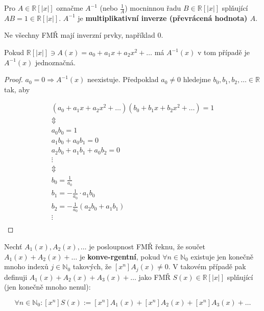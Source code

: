 \begin{definice}
	Pro $A \in \mathbb{R}[|x|]$ označme $A^{-1}$ (nebo $\frac{1}{A}$) mocninnou řadu $B \in \mathbb{R}[|x|]$ splňující $AB = 1 \in \mathbb{R}[|x|]$. $A^{-1}$ je \textbf{multiplikativní inverze (převrácená hodnota) $A$}.
\end{definice}

\begin{pozn}
	Ne všechny FMŘ mají inverzní prvky, například $0$.
\end{pozn}

\begin{tvrz}
	Pokud $\mathbb{R}[|x|] \ni A(x) = a_{0} + a_{1} x + a_{2} x^{2} + \dots$ má $A^{-1}(x)$ v tom případě je $A^{-1}(x)$ jednoznačná.
\end{tvrz}

\begin{proof}
	$a_{0} = 0 \Rightarrow A^{-1}(x)$ neexistuje. Předpoklad $a_{0} \neq 0$ hledejme $b_{0},b_{1},b_{2},\dots \in \mathbb{R}$ tak, aby
	
	$$
	\begin{array}{c}
		(a_{0} + a_{1} x + a_{2} x^{2} + \dots)(b_{0} + b_{1} x + b_{2} x^{2} + \dots) = 1 \\
		\Updownarrow \\
		a_{0}b_{0} = 1 \\
		a_{1}b_{0} + a_{0}b_{1} = 0 \\
		a_{2}b_{0} + a_{1}b_{1} + a_{0}b_{2} = 0 \\
		\vdots \\
		\Updownarrow \\
		b_{0} = \frac{1}{a_{0}} \\
		b_{1} = - \frac{1}{a_{0}} \cdot a_{1}b_{0} \\
		b_{2} = - \frac{1}{a_{0}}(a_{2}b_{0} + a_{1}b_{1}) \\
		\vdots \\
	\end{array}
	$$
\end{proof}

\begin{definice}
	Nechť $A_{1}(x), A_{2}(x), \dots$ je posloupnost FMŘ řeknu, že součet $A_{1}(x) + A_{2}(x) + \dots$ je \textbf{konve-\newline rgentní}, pokud $\forall n \in \mathbb{N}_{0}$ existuje jen konečně mnoho indexů $j \in \mathbb{N}_{0}$ takových, že $[x^{n}]A_{j}(x) \neq 0$. V takovém případě pak definuji $A_{1}(x) + A_{2}(x) + A_{3}(x) + \dots$ jako FMŘ $S(x) \in \mathbb{R}[|x|]$ splňující (jen konečně mnoho nenul):
	
	$$
	\forall n \in \mathbb{N}_{0}: [x^{n}]S(x) := [x^{n}]A_{1}(x) + [x^{n}]A_{2}(x) + [x^{n}]A_{3}(x) + \dots
	$$
\end{definice}

